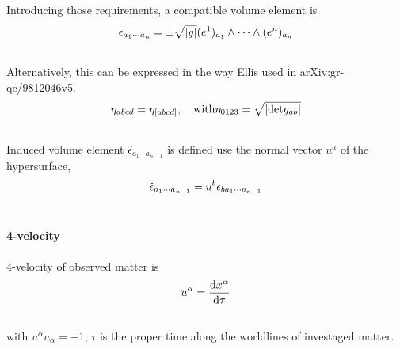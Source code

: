 \documentclass[letterpaper,10pt,english]{sphinxmanual}
\begin{document}
{Introducing those requirements, a compatible volume element is
\begin{gather}
\begin{split}\begin{equation}
\epsilon_{a_1\cdots a_n} = \pm \sqrt{|g|} (e^1)_{a_1}\wedge \cdots \wedge (e^n)_{a_n}
\end{equation}\end{split}\notag\\\begin{split}\end{split}\notag
\end{gather}
Alternatively, this can be expressed in the way Ellis used in arXiv:gr-qc/9812046v5.
\begin{gather}
\begin{split}\begin{equation}
\eta_{abcd} = \eta_{[abcd]}, \quad \mathrm{with} \eta_{0123} = \sqrt{|\mathrm {det} g_{ab}|}
\end{equation}\end{split}\notag\\\begin{split}\end{split}\notag
\end{gather}
Induced volume element $\hat \epsilon_{a_1\cdots a_{n-1}}$ is defined use the normal vector $u^a$ of the hypersurface,
\begin{gather}
\begin{split}\begin{equation}
\hat \epsilon_{a_1\cdots a_{n-1}} = u^b \epsilon_{b a_1 \cdots a_{n-1}}
\end{equation}\end{split}\notag\\\begin{split}\end{split}\notag
\end{gather}

\paragraph{4-velocity}
\label{GeneralRelativity:velocity}
4-velocity of observed matter is
\begin{gather}
\begin{split}u^\alpha = \frac{\mathrm d x^\alpha}{\mathrm d \tau}\end{split}\notag\\\begin{split}\end{split}\notag
\end{gather}
with $u^\alpha u_\alpha =-1$, $\tau$ is the proper time along the worldlines of investaged matter.


}
\end{document}
